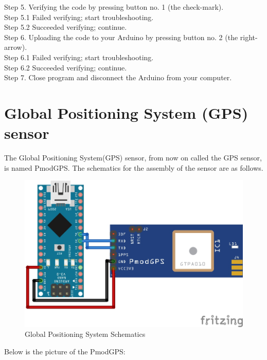 \documentclass{report}
\begin{document}
Step 5. Verifying the code by pressing button no. 1 (the check-mark). \\
Step 5.1 Failed verifying; start troubleshooting. \\
Step 5.2 Succeeded verifying; continue. \\
Step 6. Uploading the code to your Arduino by pressing button no. 2 (the right-arrow). \\
Step 6.1 Failed verifying; start troubleshooting. \\
Step 6.2 Succeeded verifying; continue. \\
Step 7. Close program and disconnect the Arduino from your computer. \\

\chapter{Global Positioning System (GPS) sensor}
The Global Positioning System(GPS) sensor, from now on called the GPS sensor, is named PmodGPS. The schematics for the assembly of the sensor are as follows. \\

\begin{figure}[H]
\begin{center}
\includegraphics[scale=1]{images/GPS.jpg}
\caption{Global Positioning System Schematics}	
\end{center}
\end{figure}

Below is the picture of the PmodGPS: \\
\end{document}
